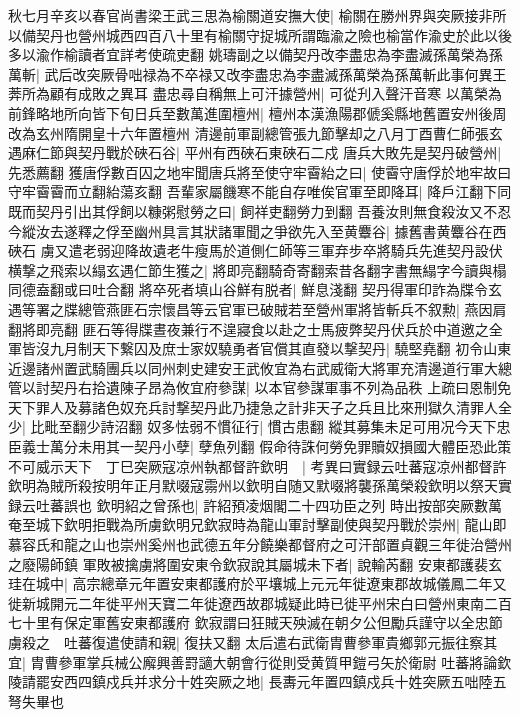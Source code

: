 秋七月辛亥以春官尚書梁王武三思為榆關道安撫大使|{
	榆關在勝州界與突厥接非所以備契丹也營州城西四百八十里有榆關守捉城所謂臨渝之險也榆當作渝史於此以後多以渝作榆讀者宜詳考使疏吏翻}
姚璹副之以備契丹改李盡忠為李盡滅孫萬榮為孫萬斬|{
	武后改突厥骨咄禄為不卒禄又改李盡忠為李盡滅孫萬榮為孫萬斬此事何異王莾所為顧有成敗之異耳}
盡忠尋自稱無上可汗據營州|{
	可從刋入聲汗音寒}
以萬榮為前鋒略地所向皆下旬日兵至數萬進圍檀州|{
	檀州本漢漁陽郡傂奚縣地舊置安州後周改為玄州隋開皇十六年置檀州}
清邊前軍副總管張九節擊却之八月丁酉曹仁師張玄遇麻仁節與契丹戰於硤石谷|{
	平州有西硤石東硤石二戍}
唐兵大敗先是契丹破營州|{
	先悉薦翻}
獲唐俘數百囚之地牢聞唐兵將至使守牢霫紿之曰|{
	使霫守唐俘於地牢故曰守牢霫霫而立翻紿蕩亥翻}
吾輩家屬饑寒不能自存唯俟官軍至即降耳|{
	降戶江翻下同}
既而契丹引出其俘飼以糠粥慰勞之曰|{
	飼祥吏翻勞力到翻}
吾養汝則無食殺汝又不忍今縱汝去遂釋之俘至幽州具言其狀諸軍聞之爭欲先入至黄麞谷|{
	據舊書黄麞谷在西硤石}
虜又遣老弱迎降故遺老牛瘦馬於道側仁師等三軍弃步卒將騎兵先進契丹設伏横撃之飛索以䌈玄遇仁節生獲之|{
	將即亮翻騎奇寄翻索昔各翻字書無䌈字今讀與榻同德盍翻或曰吐合翻}
將卒死者填山谷鮮有脱者|{
	鮮息淺翻}
契丹得軍印詐為牒令玄遇等署之牒總管燕匪石宗懷昌等云官軍已破賊若至營州軍將皆斬兵不叙勲|{
	燕因肩翻將即亮翻}
匪石等得牒晝夜兼行不遑寢食以赴之士馬疲弊契丹伏兵於中道邀之全軍皆沒九月制天下繋囚及庶士家奴驍勇者官償其直發以撃契丹|{
	驍堅堯翻}
初令山東近邊諸州置武騎團兵以同州刺史建安王武攸宜為右武威衛大將軍充清邊道行軍大總管以討契丹右拾遺陳子昂為攸宜府參謀|{
	以本官參謀軍事不列為品秩}
上疏曰恩制免天下罪人及募諸色奴充兵討撃契丹此乃捷急之計非天子之兵且比來刑獄久清罪人全少|{
	比毗至翻少詩沼翻}
奴多怯弱不慣征行|{
	慣古患翻}
縱其募集未足可用况今天下忠臣義士萬分未用其一契丹小孽|{
	孽魚列翻}
假命待誅何勞免罪贖奴損國大體臣恐此策不可威示天下　丁巳突厥寇凉州執都督許欽明　|{
	考異曰實録云吐蕃寇凉州都督許欽明為賊所殺按明年正月默啜寇霛州以欽明自随又默啜將襲孫萬榮殺欽明以祭天實録云吐蕃誤也}
欽明紹之曾孫也|{
	許紹預凌烟閣二十四功臣之列}
時出按部突厥數萬奄至城下欽明拒戰為所虜欽明兄欽寂時為龍山軍討擊副使與契丹戰於崇州|{
	龍山即慕容氏和龍之山也崇州奚州也武德五年分饒樂都督府之可汗部置貞觀三年徙治營州之廢陽師鎮}
軍敗被擒虜將圍安東令欽寂說其屬城未下者|{
	說輸芮翻}
安東都護裴玄珪在城中|{
	高宗總章元年置安東都護府於平壤城上元元年徙遼東郡故城儀鳳二年又徙新城開元二年徙平州天寶二年徙遼西故郡城疑此時已徙平州宋白曰營州東南二百七十里有保定軍舊安東都護府}
欽寂謂曰狂賊天殃滅在朝夕公但勵兵謹守以全忠節虜殺之　吐蕃復遣使請和親|{
	復扶又翻}
太后遣右武衛胄曹參軍貴鄉郭元振往察其宜|{
	胄曹參軍掌兵械公廨興善罸讁大朝會行從則受黄質甲鎧弓矢於衛尉}
吐蕃將論欽陵請罷安西四鎮戍兵并求分十姓突厥之地|{
	長夀元年置四鎮戍兵十姓突厥五咄陸五弩失畢也}

